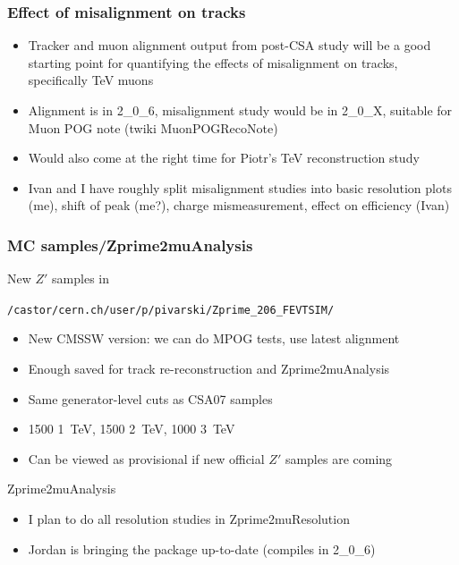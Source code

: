 \documentclass[compress]{beamer}
\begin{document}
\begin{frame}
\frametitle{Effect of misalignment on tracks}

\begin{itemize}\setlength{\itemsep}{0.5 cm}
\item Tracker and muon alignment output from post-CSA study will be a
good starting point for quantifying the effects of misalignment on
tracks, specifically TeV muons

\item Alignment is in 2\_0\_6, misalignment study would be in 2\_0\_X,
suitable for Muon POG note (twiki MuonPOGRecoNote)

\item Would also come at the right time for Piotr's TeV reconstruction
study

\item Ivan and I have roughly split misalignment studies into basic
resolution plots (me), shift of peak (me?), charge mismeasurement, effect
on efficiency (Ivan)

\end{itemize}

\end{frame}

\begin{frame}
\frametitle{MC samples/Zprime2muAnalysis}

New $Z'$ samples in

{\tt /castor/cern.ch/user/p/pivarski/Zprime\_206\_FEVTSIM/}

\begin{itemize}
\item New CMSSW version: we can do MPOG tests, use latest alignment
\item Enough saved for track re-reconstruction and Zprime2muAnalysis
\item Same generator-level cuts as CSA07 samples
\item 1500 1~TeV, 1500 2~TeV, 1000 3~TeV
\item Can be viewed as provisional if new official $Z'$ samples are coming
\end{itemize}

\vfill
Zprime2muAnalysis
\begin{itemize}
\item I plan to do all resolution studies in Zprime2muResolution
\item Jordan is bringing the package up-to-date (compiles in 2\_0\_6)
\end{itemize}

\end{frame}
\end{document}
